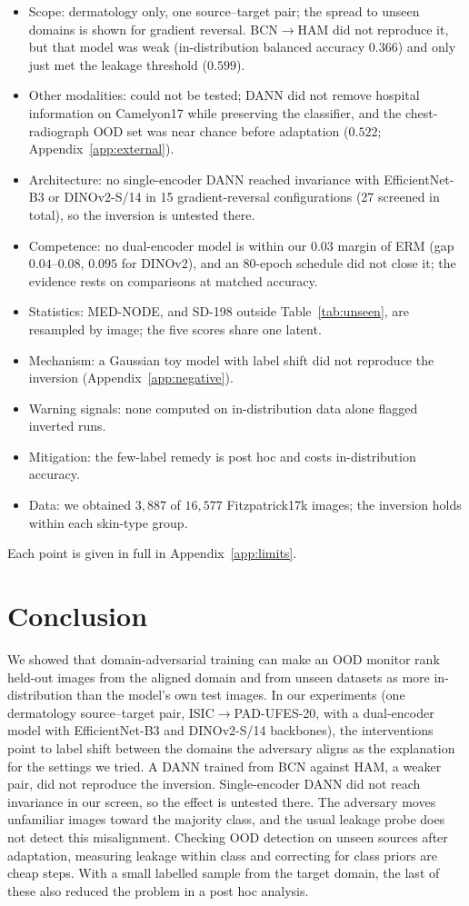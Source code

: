 \documentclass{midl}
\begin{document}
\begin{itemize}
\setlength{\itemsep}{0pt}
\item Scope: dermatology only, one source--target pair; the spread to unseen domains is shown for gradient reversal. BCN$\to$HAM did not reproduce it, but that model was weak (in-distribution balanced accuracy $0.366$) and only just met the leakage threshold ($0.599$).
\item Other modalities: could not be tested; DANN did not remove hospital information on Camelyon17 while preserving the classifier, and the chest-radiograph OOD set was near chance before adaptation ($0.522$; Appendix~\ref{app:external}).
\item Architecture: no single-encoder DANN reached invariance with EfficientNet-B3 or DINOv2-S/14 in 15 gradient-reversal configurations (27 screened in total), so the inversion is untested there.
\item Competence: no dual-encoder model is within our $0.03$ margin of ERM (gap $0.04$--$0.08$, $0.095$ for DINOv2), and an 80-epoch schedule did not close it; the evidence rests on comparisons at matched accuracy.
\item Statistics: MED-NODE, and SD-198 outside Table~\ref{tab:unseen}, are resampled by image; the five scores share one latent.
\item Mechanism: a Gaussian toy model with label shift did not reproduce the inversion (Appendix~\ref{app:negative}).
\item Warning signals: none computed on in-distribution data alone flagged inverted runs.
\item Mitigation: the few-label remedy is post hoc and costs in-distribution accuracy.
\item Data: we obtained $3{,}887$ of $16{,}577$ Fitzpatrick17k images; the inversion holds within each skin-type group.
\end{itemize}
Each point is given in full in Appendix~\ref{app:limits}.

\section{Conclusion}
We showed that domain-adversarial training can make an OOD monitor rank held-out images from the aligned domain and from unseen datasets as more
in-distribution than the model's own test images. In our experiments (one dermatology source--target pair, ISIC$\to$PAD-UFES-20, with a dual-encoder model with EfficientNet-B3 and DINOv2-S/14 backbones), the interventions point to label shift between the
domains the adversary aligns as the explanation for the settings we tried. A DANN trained from BCN against HAM, a weaker pair, did not reproduce the inversion. Single-encoder DANN did not reach invariance in our screen, so the effect is untested there. The adversary moves unfamiliar images toward the majority
class, and the usual leakage probe does not detect this misalignment. Checking OOD detection
on unseen sources after adaptation, measuring leakage within class and correcting for class
priors are cheap steps. With a small labelled sample from the target domain, the last of
these also reduced the problem in a post hoc analysis.
\end{document}
